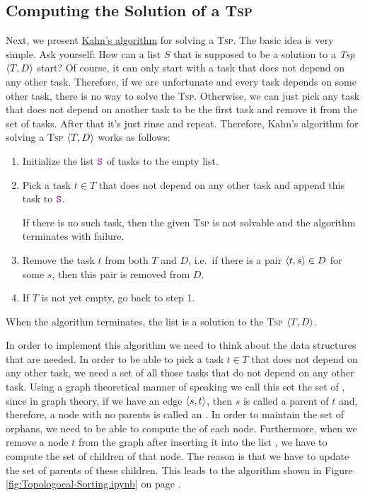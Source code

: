 \subsection{Computing the Solution of a \textsc{Tsp}}
Next, we present \href{https://en.wikipedia.org/wiki/Topological_sorting}{Kahn's algorithm} \cite{kahn:1962} for solving a \textsc{Tsp}.
The basic idea is very simple. Ask yourself:  How can a list $S$ that is supposed to be a solution to a
\textsl{Tsp} $\pair(T, D)$ start? 
Of course, it can only start with a task that does not depend on any other task.  Therefore, if we are
unfortunate and every task depends on some other task, there is no way to solve the \textsc{Tsp}.  Otherwise,
we can just pick any task that does not depend on another task to be the first task and remove it from the set
of tasks.  After that it's just rinse and repeat.  Therefore, Kahn's algorithm for solving a \textsc{Tsp}
$\pair(T, D)$ works as follows: 
\begin{enumerate}
\item Initialize the list $\mytt{S}$ of tasks to the empty list.
\item Pick a task $t \in T$ that does not depend on any other task and append this task to $\mytt{S}$.

      If there is no such task, then the given \textsc{Tsp} is not solvable and the algorithm terminates with failure.
\item Remove the task $t$ from both $T$ and $D$, i.e.~if there is a pair $\pair(t, s) \in D$ for some $s$, then
      this pair is removed from $D$.
\item If $T$ is not yet empty, go back to step 1.  
\end{enumerate}
When the algorithm terminates, the list  is a solution to the \textsc{Tsp} $\pair(T, D)$.

In order to implement this algorithm we need to think about the data structures that are needed.
In order to be able to pick a task $t \in T$ that does not depend on any other task, we need a set of all those
tasks that do not depend on any other task.  Using a graph theoretical manner of speaking we call this set the
set of , since in graph theory, if we have an edge $\pair(s, t)$, then $s$ is called a parent of
$t$ and, therefore, a node with no parents is called an .  In order to maintain the set of
orphans, we need to be able to compute the  of each node.  Furthermore, when we remove a node $t$
from the graph after inserting it into the list , we have to compute the set of children of that
node.  The reason is that we have to update the set of parents of these children.  This leads to the algorithm
shown in Figure \ref{fig:Topologocal-Sorting.ipynb} on page \pageref{fig:Topologocal-Sorting.ipynb}.

